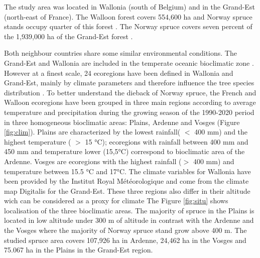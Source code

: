 \documentclass[3p,procedia]{elsarticle}
\begin{document}
The study area was located in Wallonia (south of Belgium) and in the Grand-Est (north-east of France).
The Walloon forest covers 554,600 ha and  Norway spruce stands occupy quarter of this forest \citep{Alderweireld_2015}. 
The Norway spruce covers seven percent of the 1,939,000 ha of the Grand-Est forest \citep{IGN2022}. 

Both neighbour countries share some similar environmental conditions.
The Grand-Est and Wallonia are included in the temperate oceanic bioclimatic zone \citep{lindner_climate_2010}.
However at a finest scale, 24 ecoregions have been defined in  Wallonia and Grand-Est, mainly by climate parameters and therefore influence the tree species distribution \citep{walthert_tree_2017}.
To better understand the dieback of Norway spruce, the French and Walloon ecoregions have been grouped in three main regions according to average temperature and precipitation during the growing season of the 1990-2020 period in three homogeneous bioclimatic areas: Plains, Ardenne and Vosges (Figure \ref{fig:clim}).
Plains are characterized by the lowest rainfall( $<$ 400 mm) and the highest temperature ( $>$ 15 °C);
ecoregions with rainfall between 400 mm and 450 mm and temperature lower (15,5°C) correspond to bioclimatic area of the Ardenne.
Vosges are ecoregions with the highest rainfall ($>$ 400 mm) and temperature between 15.5 °C and 17°C.
The climate variables for Wallonia have been provided by the Institut Royal Météorologique and come from the climate map Digitalis \citep{piedallu_presentation_2014} for the Grand-Est.
These three regions also differ in their altitude wich can be considered as a proxy for climate
The Figure \ref{fig:situ} shows localisation of the three bioclimatic areas. 
The majority of spruce in the Plains is located in low altitude under 300 m of altitude in contrast with the Ardenne and the Vosges where the majority of Norway spruce stand grow above 400 m. 
The studied spruce area covers 107,926 ha in Ardenne, 24,462 ha in the Vosges and 75.067 ha in the Plains in the Grand-Est region.
\end{document}
